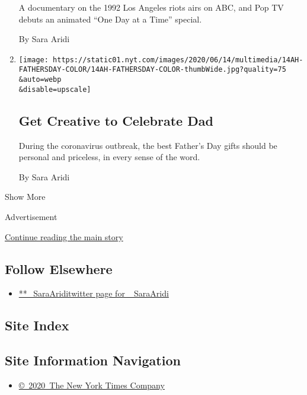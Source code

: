\begin{enumerate}
  A documentary on the 1992 Los Angeles riots airs on ABC, and Pop TV
  debuts an animated ``One Day at a Time'' special.

  By Sara Aridi
\item
  \href{/2020/06/13/at-home/fathers-day-gifts-coronavirus.html}{}

  \texttt{[image: https://static01.nyt.com/images/2020/06/14/multimedia/14AH-FATHERSDAY-COLOR/14AH-FATHERSDAY-COLOR-thumbWide.jpg?quality=75\\\&auto=webp\\\&disable=upscale]}

  \hypertarget{get-creative-to-celebrate-dad}{%
  \subsection{Get Creative to Celebrate
  Dad}\label{get-creative-to-celebrate-dad}}

  During the coronavirus outbreak, the best Father's Day gifts should be
  personal and priceless, in every sense of the word.

  By Sara Aridi
\end{enumerate}

Show More

Advertisement

\protect\hyperlink{after-mid2}{Continue reading the main story}

\hypertarget{follow-elsewhere}{%
\subsection{Follow Elsewhere}\label{follow-elsewhere}}

\begin{itemize}
\tightlist
\item
  \href{https://twitter.com/_SaraAridi}{**\_SaraAriditwitter page for
  \_SaraAridi}
\end{itemize}

\hypertarget{site-index}{%
\subsection{Site Index}\label{site-index}}

\hypertarget{site-information-navigation}{%
\subsection{Site Information
Navigation}\label{site-information-navigation}}

\begin{itemize}
\tightlist
\item
  \href{https://help.nytimes.com/hc/en-us/articles/115014792127-Copyright-notice}{©~2020~The
  New York Times Company}
\end{itemize}

